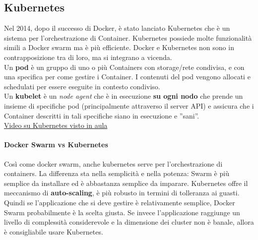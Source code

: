 \subsection{Kubernetes}
Nel 2014, dopo il successo di Docker, è stato lanciato Kubernetes che è un sistema per l'orchestrazione di Container. Kubernetes possiede molte funzionalità simili a Docker swarm ma è più efficiente. Docker e Kubernetes non sono in contrapposizione tra di loro, ma si integrano a vicenda.\\
Un \textbf{pod} è un gruppo di uno o più Containers con storage/rete condivisa, e con una specifica per come gestire i Container. I contenuti del pod vengono allocati e schedulati per essere eseguite in contesto condiviso.\\
Un \textbf{kubelet} è un \textit{node agent} che è in esecuzione \textbf{su ogni nodo} che prende un insieme di specifiche pod (principalmente attraverso il server API) e assicura che i Container descritti in tali specifiche siano in esecuzione e ”sani”.\\
\href{https://www.youtube.com/watch?v=PH-2FfFD2PU}{Video su Kubernetes visto in aula}

\paragraph{Docker Swarm vs Kubernetes} Così come docker swarm, anche kubernetes serve per l'orchestrazione di containers. La differenza sta nella semplicità e nella potenza: Swarm è più semplice da installare ed è abbastanza semplice da imparare. Kubernetes offre il meccanismo di \textbf{auto-scaling}, è più robusto in termini di tolleranza ai guasti.\\
Quindi se l’applicazione che si deve gestire è relativamente semplice, Docker Swarm probabilmente è la scelta giusta. Se invece l’applicazione raggiunge un livello di complessità considerevole e la dimensione dei cluster non è banale, allora è consigliabile usare  Kubernetes.